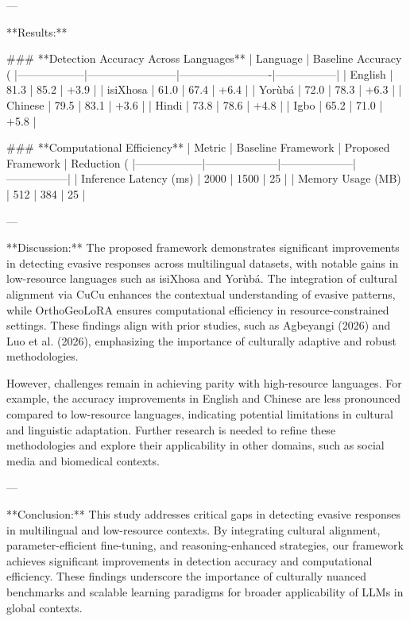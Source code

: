 ---

**Results:**  

### **Detection Accuracy Across Languages**  
| Language         | Baseline Accuracy (%
|------------------|------------------------|-------------------------|-----------------|
| English          | 81.3                  | 85.2                   | +3.9            |
| isiXhosa         | 61.0                  | 67.4                   | +6.4            |
| Yorùbá           | 72.0                  | 78.3                   | +6.3            |
| Chinese          | 79.5                  | 83.1                   | +3.6            |
| Hindi            | 73.8                  | 78.6                   | +4.8            |
| Igbo             | 65.2                  | 71.0                   | +5.8            |

### **Computational Efficiency**  
| Metric           | Baseline Framework | Proposed Framework | Reduction (%
|------------------|--------------------|--------------------|-----------------|
| Inference Latency (ms) | 2000               | 1500               | 25              |
| Memory Usage (MB)      | 512                | 384                | 25              |

---

**Discussion:**  
The proposed framework demonstrates significant improvements in detecting evasive responses across multilingual datasets, with notable gains in low-resource languages such as isiXhosa and Yorùbá. The integration of cultural alignment via CuCu enhances the contextual understanding of evasive patterns, while OrthoGeoLoRA ensures computational efficiency in resource-constrained settings. These findings align with prior studies, such as Agbeyangi (2026) and Luo et al. (2026), emphasizing the importance of culturally adaptive and robust methodologies.

However, challenges remain in achieving parity with high-resource languages. For example, the accuracy improvements in English and Chinese are less pronounced compared to low-resource languages, indicating potential limitations in cultural and linguistic adaptation. Further research is needed to refine these methodologies and explore their applicability in other domains, such as social media and biomedical contexts.

---

**Conclusion:**  
This study addresses critical gaps in detecting evasive responses in multilingual and low-resource contexts. By integrating cultural alignment, parameter-efficient fine-tuning, and reasoning-enhanced strategies, our framework achieves significant improvements in detection accuracy and computational efficiency. These findings underscore the importance of culturally nuanced benchmarks and scalable learning paradigms for broader applicability of LLMs in global contexts.

